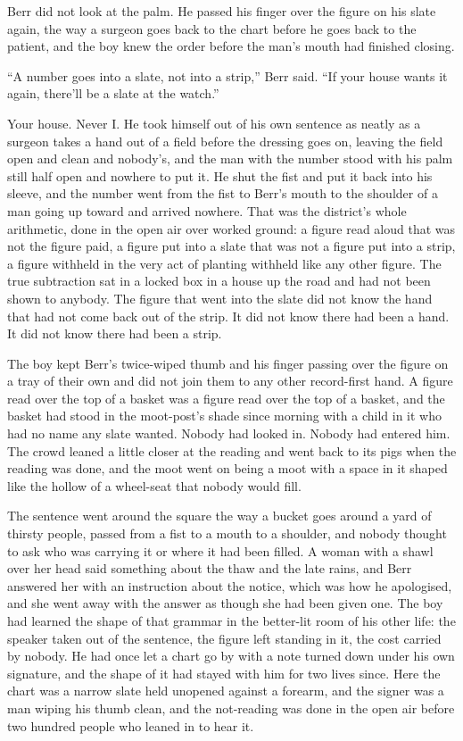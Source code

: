 Berr did not look at the palm. He passed his finger over the figure on his slate again, the way a surgeon goes back to the chart before he goes back to the patient, and the boy knew the order before the man's mouth had finished closing.

“A number goes into a slate, not into a strip,” Berr said. “If your house wants it again, there'll be a slate at the watch.”

Your house. Never I. He took himself out of his own sentence as neatly as a surgeon takes a hand out of a field before the dressing goes on, leaving the field open and clean and nobody's, and the man with the number stood with his palm still half open and nowhere to put it. He shut the fist and put it back into his sleeve, and the number went from the fist to Berr's mouth to the shoulder of a man going up toward  and arrived nowhere. That was the district's whole arithmetic, done in the open air over worked ground: a figure read aloud that was not the figure paid, a figure put into a slate that was not a figure put into a strip, a figure withheld in the very act of planting withheld like any other figure. The true subtraction sat in a locked box in a house up the road and had not been shown to anybody. The figure that went into the slate did not know the hand that had not come back out of the strip. It did not know there had been a hand. It did not know there had been a strip.

The boy kept Berr's twice-wiped thumb and his finger passing over the figure on a tray of their own and did not join them to any other record-first hand. A figure read over the top of a basket was a figure read over the top of a basket, and the basket had stood in the moot-post's shade since morning with a child in it who had no name any slate wanted. Nobody had looked in. Nobody had entered him. The crowd leaned a little closer at the reading and went back to its pigs when the reading was done, and the moot went on being a moot with a space in it shaped like the hollow of a wheel-seat that nobody would fill.

The sentence went around the square the way a bucket goes around a yard of thirsty people, passed from a fist to a mouth to a shoulder, and nobody thought to ask who was carrying it or where it had been filled. A woman with a shawl over her head said something about the thaw and the late rains, and Berr answered her with an instruction about the notice, which was how he apologised, and she went away with the answer as though she had been given one. The boy had learned the shape of that grammar in the better-lit room of his other life: the speaker taken out of the sentence, the figure left standing in it, the cost carried by nobody. He had once let a chart go by with a note turned down under his own signature, and the shape of it had stayed with him for two lives since. Here the chart was a narrow slate held unopened against a forearm, and the signer was a man wiping his thumb clean, and the not-reading was done in the open air before two hundred people who leaned in to hear it.

